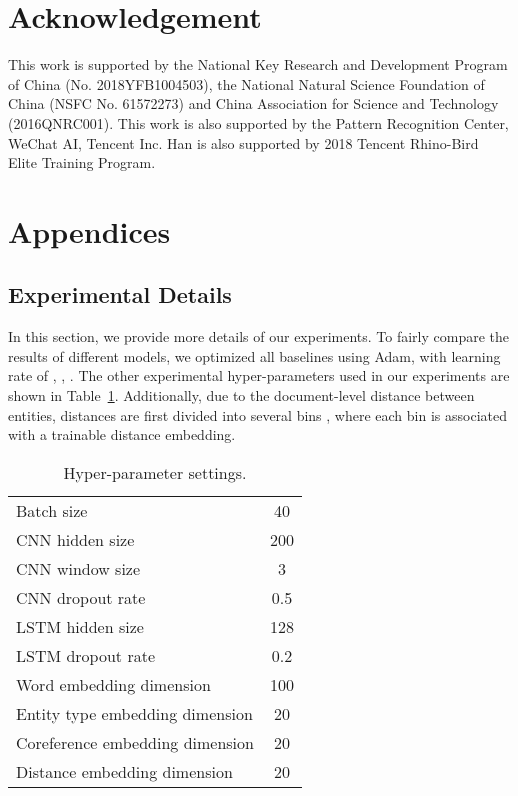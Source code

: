 \documentclass[11pt,a4paper]{article}
\begin{document}
\section{Acknowledgement}
This work is supported by the National Key Research and Development Program of China (No. 2018YFB1004503), the National Natural Science Foundation of China (NSFC No. 61572273) and China Association for Science and Technology (2016QNRC001). This work is also supported by the Pattern Recognition Center, WeChat AI, Tencent Inc. Han is also supported by 2018 Tencent Rhino-Bird Elite Training Program.



\clearpage
\appendix

\section{Appendices}
\label{sec:appendix}


\subsection{Experimental Details}

In this section, we provide more details of our experiments. To fairly compare the results of different models, we optimized all baselines using Adam, with learning rate of , , .  The other experimental hyper-parameters used in our experiments are shown in Table~\ref{table:hyper-parameter}. Additionally, due to the document-level distance between entities, distances are first divided into several bins , where each bin is associated with a trainable distance embedding. 

\begin{table}[thp!]
\centering
\small
\begin{tabular}{l | c}\toprule
Batch size & 40 \\
CNN hidden size & 200 \\
CNN window size & 3 \\
CNN dropout rate  & 0.5\\
LSTM hidden size & 128 \\
LSTM dropout rate  & 0.2\\
Word embedding dimension & 100\\
Entity type embedding dimension & 20 \\
Coreference embedding dimension & 20 \\
Distance embedding dimension & 20  \\
\bottomrule
\end{tabular}
 \caption{Hyper-parameter settings.}
\label{table:hyper-parameter}
\end{table}
\end{document}
